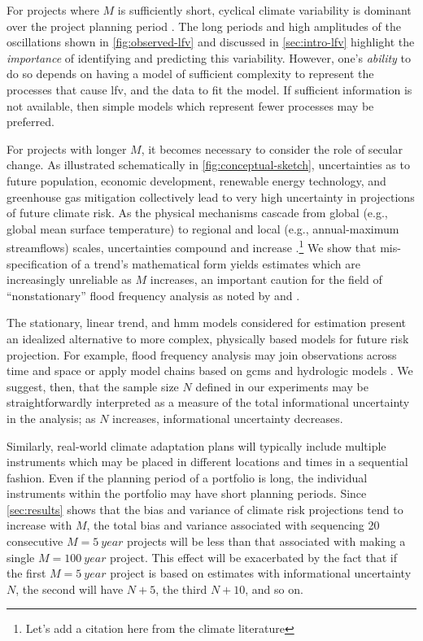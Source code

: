 \documentclass[
]{agujournal2018}
\makeatletter
\newcommand{\eg}{e.g.\@\xspace}
\makeatother
\begin{document}
For projects where $M$ is sufficiently short, cyclical climate variability is dominant over the project planning period \citep{Jain:2001hz,Hodgkins:2017hw}.
The long periods and high amplitudes of the oscillations shown in \cref{fig:observed-lfv} and discussed in \cref{sec:intro-lfv} highlight the \emph{importance} of identifying and predicting this variability.
However, one's \emph{ability} to do so depends on having a model of sufficient complexity to represent the processes that cause \gls{lfv}, and the data to fit the model.
If sufficient information is not available, then simple models which represent fewer processes may be preferred.

For projects with longer $M$, it becomes necessary to consider the role of secular change.
As illustrated schematically in \cref{fig:conceptual-sketch}, uncertainties as to future population, economic development, renewable energy technology, and greenhouse gas mitigation collectively lead to very high uncertainty in projections of future climate risk.
As the physical mechanisms cascade from global (\eg, global mean surface temperature) to regional  \citep[\eg, storm track position][]{Barnes:2015gl} and local (\eg, annual-maximum streamflows) scales, uncertainties compound and increase \citep{Dittes:2017he}.\footnote{Let's add a citation here from the climate literature}
We show that mis-specification of a trend's mathematical form yields estimates which are increasingly unreliable as $M$ increases, an important caution for the field of ``nonstationary'' flood frequency analysis as noted by \citet{Montanari:2014hl} and \citet{Serinaldi:2015bq}.

The stationary, linear trend, and \gls{hmm} models considered for estimation present an idealized alternative to more complex, physically based models for future risk projection.
For example, flood frequency analysis may join observations across time and space \citep{Lima:2016kd,Merz:2008eh} or apply model chains based on \glspl{gcm} and hydrologic models \citep[see][]{Merz:2014gf}.
We suggest, then, that the sample size $N$ defined in our experiments may be straightforwardly interpreted as a measure of the total informational uncertainty in the analysis; as $N$ increases, informational uncertainty decreases.

Similarly, real-world climate adaptation plans will typically include multiple instruments which may be placed in different locations and times in a sequential fashion.
Even if the planning period of a portfolio is long, the individual instruments within the portfolio may have short planning periods.
Since \cref{sec:results} shows that the bias and variance of climate risk projections tend to increase with $M$, the total bias and variance associated with sequencing 20 consecutive $M=\SI{5}{year}$ projects will be less than that associated with making a single $M=\SI{100}{year}$ project.
This effect will be exacerbated by the fact that if the first $M=\SI{5}{year}$ project is based on estimates with informational uncertainty $N$, the second will have $N+5$, the third $N+10$, and so on.
\end{document}
